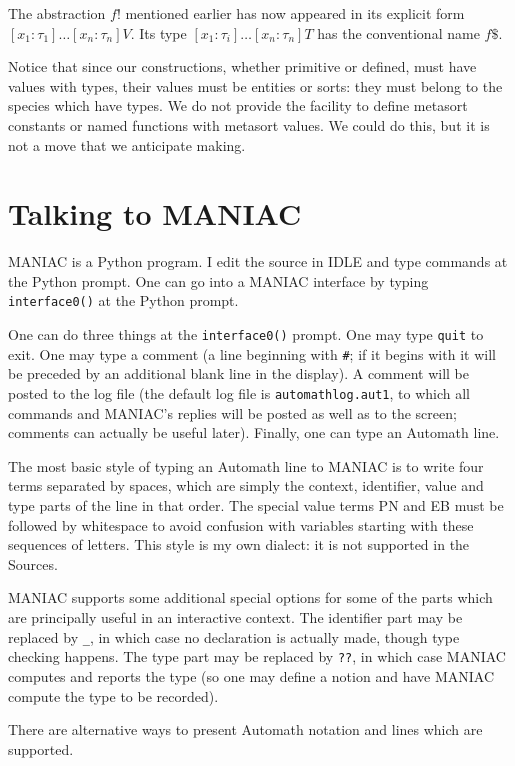 \documentclass[12pt]{article}
\begin{document}
The abstraction $f!$ mentioned earlier has now appeared in its explicit form $[x_1:\tau_1]\ldots[x_n:\tau_n]V$.  Its type $[x_1:\tau_i]\ldots[x_n:\tau_n]T$ has the conventional name $f\$$.

Notice that since our constructions, whether primitive or defined, must have values with types, their values must be entities or sorts:  they must belong to the species which have types.  We do not provide the facility to define metasort constants or named functions with metasort values.  We could do this, but it is not a move that we anticipate making.

\newpage

\section{Talking to MANIAC}

MANIAC is a Python program.  I edit the source in IDLE and type commands at the Python prompt.  One can go into a MANIAC interface by typing {\tt interface0()} at the Python prompt.

One can do three things at the {\tt interface0()} prompt.  One may type {\tt quit} to exit.  One may type a comment (a line beginning with {\tt \#};  if it begins with \verb ##  it will be preceded by an additional blank line in the display).  A comment will be posted to the log file (the default log file is {\tt automathlog.aut1}, to which all commands and MANIAC's replies will be posted as well as to the screen;  comments can actually be useful later).  Finally, one can type an Automath line.

The most basic style of typing an Automath line to MANIAC is to write four terms separated by spaces, which are simply the context, identifier, value and type parts of the line in that order.
The special value terms PN and EB must be followed by whitespace to avoid confusion with variables starting with these sequences of letters.  This style is my own dialect:  it is not supported in the Sources.

MANIAC supports some additional special options for some of the parts which are principally useful in an interactive context.  The identifier part may be replaced by {\tt \_}, in which
case no declaration is actually made, though type checking happens.  The type part may be replaced by {\tt ??}, in which case MANIAC computes and reports the type (so one may
define a notion and have MANIAC compute the type to be recorded).

There are alternative ways to present Automath notation and lines which are supported.
\end{document}
